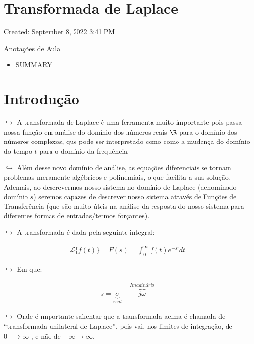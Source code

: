 \documentclass{article}
\begin{document}
\begin{itemize}
{\section{Transformada de Laplace}\label{transformada-de-laplace}}

Created: September 8, 2022 3:41 PM

\href{Transformada\%20de\%20Laplace\%203ba1dd06d6854aaea26b6356883badd6/Anotac\%CC\%A7o\%CC\%83es\%20de\%20Aula\%20449f385a0f564b3a95858cc2a4879d34.md}{Anotações
de Aula}

\begin{itemize}
\tightlist
\item
  SUMMARY
\end{itemize}

\hypertarget{introduuxe7uxe3o-3}{%
\section{Introdução}\label{introduuxe7uxe3o-3}}

\(\hookrightarrow\) A transformada de Laplace é uma ferramenta muito
importante pois passa nossa função em análise do domínio dos números
reais \(\R\) para o domínio dos números complexos, que pode ser
interpretado como como a mudança do domínio do tempo \(t\) para o
domínio da frequência.

\(\hookrightarrow\) Além desse novo domínio de análise, as equações
diferenciais se tornam problemas meramente algébricos e polinomiais, o
que facilita a sua solução. Ademais, ao descrevermos nosso sistema no
domínio de Laplace (denominado domínio \(s\)) seremos capazes de
descrever nosso sistema através de Funções de Transferência (que são
muito úteis na análise da resposta do nosso sistema para diferentes
formas de entradas/termos forçantes).

\(\hookrightarrow\) A transformada é dada pela seguinte integral:

\[
\begin{align}
\mathcal L\{f(t)\}  = F(s) = \int_{0^-}^{\infty}f(t)e^{-st}dt
\end{align}
\]

\(\hookrightarrow\) Em que:

\[
\begin{align}
s = \underbrace{\sigma}_{real} + \overbrace{j\omega}^{Imaginário}
\end{align}
\]

\(\hookrightarrow\) Onde é importante salientar que a transformada acima
é chamada de ``transformada unilateral de Laplace'', pois vai, nos
limites de integração, de \(0^- \rightarrow \infty\) , e não de
\(-\infty \rightarrow \infty\).


\end{itemize}
\end{document}
